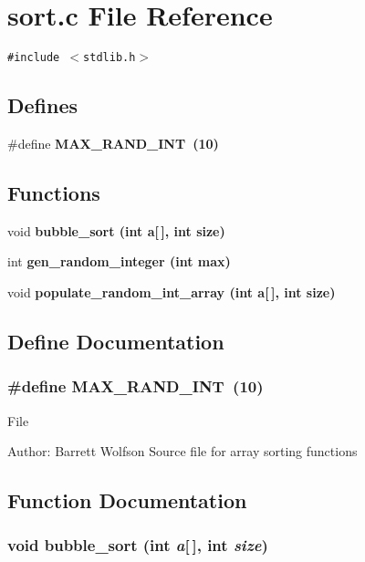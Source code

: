 \section{sort.c File Reference}
\label{sort_8c}
{\tt \#include $<$stdlib.h$>$}\par
\subsection*{Defines}
\begin{CompactItemize}
\item 
\#define \bf{MAX\_\-RAND\_\-INT}~(10)
\end{CompactItemize}
\subsection*{Functions}
\begin{CompactItemize}
\item 
void \bf{bubble\_\-sort} (int a[$\,$], int size)
\item 
int \bf{gen\_\-random\_\-integer} (int max)
\item 
void \bf{populate\_\-random\_\-int\_\-array} (int a[$\,$], int size)
\end{CompactItemize}


\subsection{Define Documentation}
\subsubsection{\setlength{\rightskip}{0pt plus 5cm}\#define MAX\_\-RAND\_\-INT~(10)}\label{sort_8c_dc72a4f94f12593c2dfa011bc3ba6658}


File \begin{Desc}
\item[Author:]Barrett Wolfson Source file for array sorting functions \end{Desc}


\subsection{Function Documentation}
\subsubsection{\setlength{\rightskip}{0pt plus 5cm}void bubble\_\-sort (int {\em a}[$\,$], int {\em size})}\label{sort_8c_c715f97e1353ec804edd8cbda7dcd1a1}


